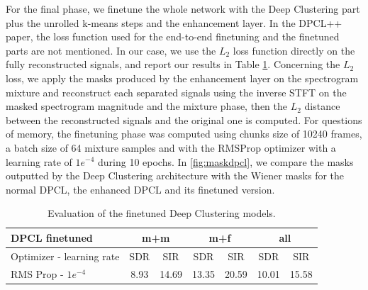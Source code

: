 \documentclass[master, tikz, final,11pt, dvipdfmx]{iscs-thesis}
\begin{document}
For the final phase, we finetune the whole network with the Deep Clustering part plus the unrolled k-means steps and the enhancement layer. In the DPCL++ paper, the loss function used for the end-to-end finetuning and the finetuned parts are not mentioned. In our case, we use the $L_2$ loss function directly on the fully reconstructed signals, and report our results in Table \ref{table:DPCL400fine}. Concerning the $L_2$ loss, we apply the masks produced by the enhancement layer on the spectrogram mixture and reconstruct each separated signals using the inverse STFT on the masked spectrogram magnitude and the mixture phase, then the $L_2$ distance between the reconstructed signals and the original one is computed. For questions of memory, the finetuning phase was computed using chunks size of 10240 frames, a batch size of 64 mixture samples and with the RMSProp optimizer with a learning rate of $1e^{-4}$ during 10 epochs. In \autoref{fig:maskdpcl}, we compare the masks outputted by the Deep Clustering architecture with the Wiener masks for the normal DPCL, the enhanced DPCL and its finetuned version.

\begin{table}[h]
\centering
\begin{tabular}{l|c|c|c|c|c|c}
DPCL finetuned & \multicolumn{2}{c|}{m+m} & \multicolumn{2}{c|}{m+f} & \multicolumn{2}{c}{all} \\ 
\hline 
 Optimizer - learning rate & SDR & SIR & SDR & SIR & SDR & SIR \\ 
\hline 
RMS Prop - $1e^{-4}$  & 8.93 & 14.69 & 13.35 & 20.59 & 10.01 & 15.58 \\ 

\end{tabular}
\caption{Evaluation of the finetuned Deep Clustering models.}
\label{table:DPCL400fine}
\end{table}
\end{document}
